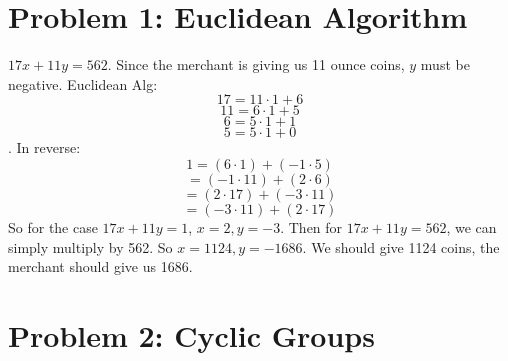 \documentclass[12pt]{article}
\title{\scalebox{2}{Math 431 Exam 1}}
\author{\scalebox{1.5}{Theo Koss}}
\date{October 2020}
\begin{document}
\maketitle
\section{Problem 1: Euclidean Algorithm}
$17x+11y=562$. Since the merchant is giving us 11 ounce coins, $y$ must be negative. Euclidean Alg:$$17=11\cdot1+6$$ $$11=6\cdot1+5$$ $$6=5\cdot1+1$$ $$5=5\cdot1+0$$. In reverse:$$1=(6\cdot1)+(-1\cdot5)$$ $$=(-1\cdot11)+(2\cdot6)$$ $$=(2\cdot17)+(-3\cdot11)$$ $$=(-3\cdot11)+(2\cdot17)$$ So for the case $17x+11y=1$, $x=2,y=-3$. Then for $17x+11y=562$, we can simply multiply by 562. So $x=1124, y=-1686$. We should give 1124 coins, the merchant should give us 1686.
\section{Problem 2: Cyclic Groups}
\end{document}
